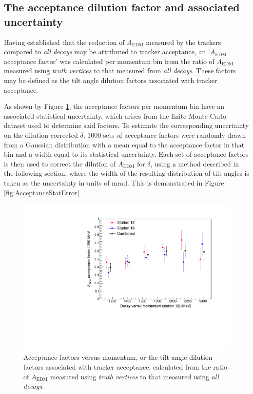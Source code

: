 \pagebreak

\subsection{The acceptance dilution factor and associated uncertainty}\label{sec:AcceptDilFactor}

Having established that the reduction of $A_{\text{EDM}}$ measured by the trackers compared to \textit{all decays} may be attributed to tracker acceptance, an `$A_{\text{EDM}}$ acceptance factor' was calculated per momentum bin from the ratio of $A_{\text{EDM}}$ measured using \textit{truth vertices} to that measured from \textit{all decays}. These factors may be defined as the tilt angle dilution factors associated with tracker acceptance. 

As shown by Figure \ref{fig:AcceptanceFactor}, the acceptance factors per momentum bin have an associated statistical uncertainty, which arises from the finite Monte Carlo dataset used to determine said factors. To estimate the corresponding uncertainty on the dilution corrected $\delta$, 1000 sets of acceptance factors were randomly drawn from a Gaussian distribution with a mean equal to the acceptance factor in that bin and a width equal to its statistical uncertainty. Each set of acceptance factors is then used to correct the dilution of $A_{\text{EDM}}$ for $\delta$, using a method described in the following section, where the width of the resulting distribution of tilt angles is taken as the uncertainty in units of mrad. This is demonstrated in Figure \ref{fig:AcceptanceStatError}.

\begin{figure}[t!]
\centering{}
\includegraphics[trim={0 0 0 0},clip,width=.69\textwidth]{Images/Chapter5/OverlayMainAcceptanceWeightingVsMomentum.pdf}
\caption{Acceptance factors versus momentum, or the tilt angle dilution factors associated with tracker acceptance, calculated from the ratio of $A_{\text{EDM}}$ measured using \textit{truth vertices} to that measured using \textit{all decays}.} 
\label{fig:AcceptanceFactor}
\end{figure} 
  
